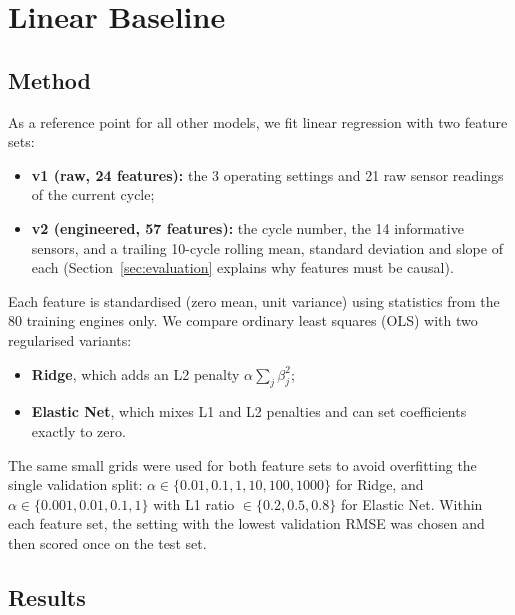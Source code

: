 
\section{Linear Baseline}
\label{sec:linear_baseline}

\subsection{Method}

As a reference point for all other models, we fit linear regression with two
feature sets:
\begin{itemize}
  \item \textbf{v1 (raw, 24 features):} the 3 operating settings and 21 raw
        sensor readings of the current cycle;
  \item \textbf{v2 (engineered, 57 features):} the cycle number, the 14
        informative sensors, and a trailing 10-cycle rolling mean, standard
        deviation and slope of each (Section~\ref{sec:evaluation} explains why
        features must be causal).
\end{itemize}
Each feature is standardised (zero mean, unit variance) using statistics from
the 80 training engines only. We compare ordinary least squares (OLS) with two
regularised variants:
\begin{itemize}
  \item \textbf{Ridge}, which adds an L2 penalty $\alpha \sum_j \beta_j^2$;
  \item \textbf{Elastic Net}, which mixes L1 and L2 penalties and can set
        coefficients exactly to zero.
\end{itemize}
The same small grids were used for both feature sets to avoid overfitting the
single validation split: $\alpha \in \{0.01, 0.1, 1, 10, 100, 1000\}$ for
Ridge, and $\alpha \in \{0.001, 0.01, 0.1, 1\}$ with L1 ratio
$\in \{0.2, 0.5, 0.8\}$ for Elastic Net. Within each feature set, the setting
with the lowest validation RMSE was chosen and then scored once on the test
set.



\subsection{Results}

